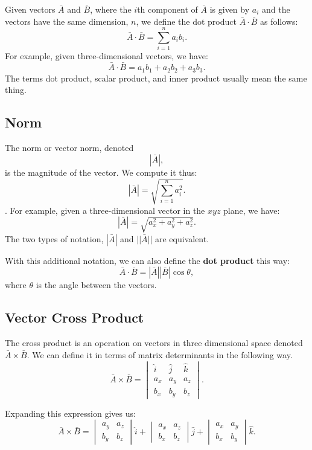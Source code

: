 \documentclass[
]{book}
\begin{document}
Given vectors \(\bar{A}\) and \(\bar{B}\), where the \(i\)th component of \(\bar{A}\) is given by \(a_i\) and the vectors have the same dimension, \(n\), we define the dot product \(\bar{A} \cdot \bar{B}\) as follows:
\[\bar{A} \cdot \bar{B} = \sum_{i=1}^{n}a_i b_i .\]
For example, given three-dimensional vectors, we have:
\[\bar{A} \cdot \bar{B} = a_1 b_1 + a_2 b_2 + a_3 b_3 .\]
The terms dot product, scalar product, and inner product usually mean the same thing.

\hypertarget{norm}{%
\subsection{Norm}\label{norm}}

The norm or vector norm, denoted
\[ \left| \bar{A} \right|,\]
is the magnitude of the vector. We compute it thus:
\[ \left| \bar{A} \right| = \sqrt{\sum_{i=1}^{n} a_i^2} .\].
For example, given a three-dimensional vector in the \(xyz\) plane, we have:
\[ \left| \bar{A} \right| = \sqrt{a_x^2 + a_y^2 + a_z^2} .\]
The two types of notation, \(| \bar{A} |\) and \(|| \bar{A} ||\) are equivalent.

With this additional notation, we can also define the \textbf{dot product} this way:
\[\bar{A} \cdot \bar{B} = \left| \bar{A} \right| \left| \bar{B} \right| \cos{\theta} ,\]
where \(\theta\) is the angle between the vectors.

\hypertarget{vector-cross-product}{%
\subsection{Vector Cross Product}\label{vector-cross-product}}

The cross product is an operation on vectors in three dimensional space denoted \(\bar{A} \times \bar{B} .\) We can define it in terms of matrix determinants in the following way.
\[ \bar{A} \times \bar{B} = \begin{vmatrix}
\hat{i} & \hat{j} & \hat{k}\\
a_x & a_y & a_z\\
b_x & b_y & b_z
\end{vmatrix}
.\]

Expanding this expression gives us:
\[ \bar{A} \times \bar{B} = \begin{vmatrix}
a_y & a_z\\
b_y & b_z
\end{vmatrix} \hat{i}
+ \begin{vmatrix}
a_x & a_z\\
b_x & b_z
\end{vmatrix} \hat{j}
+ \begin{vmatrix}
a_x & a_y\\
b_x & b_y
\end{vmatrix} \hat{k}
.\]
\end{document}
